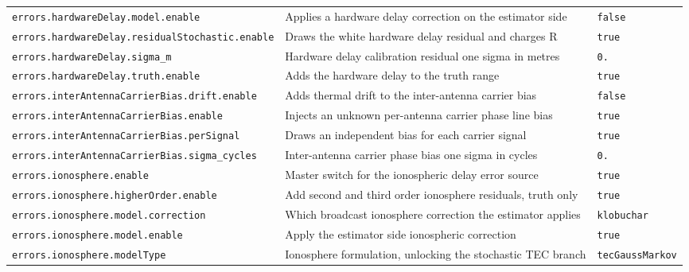 \begin{center}
\begin{longtable}{>{\raggedright\arraybackslash\scriptsize\ttfamily}p{}|>{\raggedright\arraybackslash}p{}|>{\raggedright\arraybackslash\scriptsize\ttfamily}p{}}
\texttt{errors.\allowbreak hardware\allowbreak Delay.\allowbreak model.\allowbreak enable} & Applies a hardware delay correction on the estimator side & \texttt{false} \\
\texttt{errors.\allowbreak hardware\allowbreak Delay.\allowbreak residual\allowbreak Stochastic.\allowbreak enable} & Draws the white hardware delay residual and charges R & \texttt{true} \\
\texttt{errors.\allowbreak hardware\allowbreak Delay.\allowbreak sigma\_\allowbreak m} & Hardware delay calibration residual one sigma in metres & \texttt{0.\allowbreak 05} \\
\texttt{errors.\allowbreak hardware\allowbreak Delay.\allowbreak truth.\allowbreak enable} & Adds the hardware delay to the truth range & \texttt{true} \\
\texttt{errors.\allowbreak inter\allowbreak Antenna\allowbreak Carrier\allowbreak Bias.\allowbreak drift.\allowbreak enable} & Adds thermal drift to the inter-antenna carrier bias & \texttt{false} \\
\texttt{errors.\allowbreak inter\allowbreak Antenna\allowbreak Carrier\allowbreak Bias.\allowbreak enable} & Injects an unknown per-antenna carrier phase line bias & \texttt{true} \\
\texttt{errors.\allowbreak inter\allowbreak Antenna\allowbreak Carrier\allowbreak Bias.\allowbreak per\allowbreak Signal} & Draws an independent bias for each carrier signal & \texttt{true} \\
\texttt{errors.\allowbreak inter\allowbreak Antenna\allowbreak Carrier\allowbreak Bias.\allowbreak sigma\_\allowbreak cycles} & Inter-antenna carrier phase bias one sigma in cycles & \texttt{0.\allowbreak 25} \\
\texttt{errors.\allowbreak ionosphere.\allowbreak enable} & Master switch for the ionospheric delay error source & \texttt{true} \\
\texttt{errors.\allowbreak ionosphere.\allowbreak higher\allowbreak Order.\allowbreak enable} & Add second and third order ionosphere residuals, truth only & \texttt{true} \\
\texttt{errors.\allowbreak ionosphere.\allowbreak model.\allowbreak correction} & Which broadcast ionosphere correction the estimator applies & \texttt{klobuchar} \\
\texttt{errors.\allowbreak ionosphere.\allowbreak model.\allowbreak enable} & Apply the estimator side ionospheric correction & \texttt{true} \\
\texttt{errors.\allowbreak ionosphere.\allowbreak model\allowbreak Type} & Ionosphere formulation, unlocking the stochastic TEC branch & \texttt{tec\allowbreak Gauss\allowbreak Markov} \\

\end{longtable}
\end{center}
